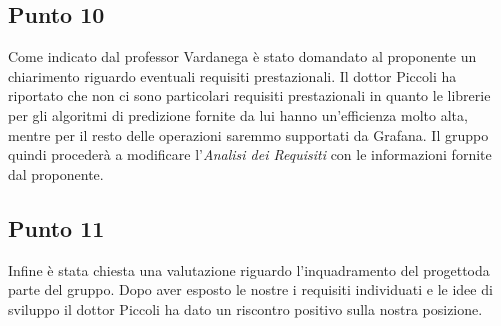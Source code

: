     \subsection{Punto 10}
        Come indicato dal professor Vardanega è stato domandato al proponente un chiarimento riguardo eventuali requisiti prestazionali. Il dottor Piccoli ha riportato che non ci sono particolari requisiti prestazionali in quanto le librerie per gli algoritmi di predizione fornite da lui hanno un'efficienza molto alta, mentre per il resto delle operazioni saremmo supportati da Grafana\glo. Il gruppo quindi procederà a modificare l'\textit{Analisi dei Requisiti} con le informazioni fornite dal proponente.
    \subsection{Punto 11}
        Infine è stata chiesta una valutazione riguardo l'inquadramento del progetto\glosp da parte del gruppo. Dopo aver esposto le nostre i requisiti individuati e le idee di sviluppo il dottor Piccoli ha dato un riscontro positivo sulla nostra posizione.